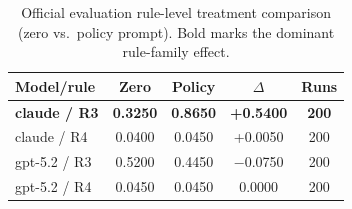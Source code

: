 \begin{table}[t]
\caption{Official evaluation rule-level treatment comparison (zero vs.\ policy prompt). Bold marks the dominant rule-family effect.}
\label{tab:evaluation_rule_treatment}
\centering
\small
\setlength{\tabcolsep}{2pt}
\begin{tabularx}{\columnwidth}{@{}LCCCC@{}}
\toprule
Model/rule & Zero & Policy & $\Delta$ & Runs \\
\midrule
\textbf{claude / R3} & \textbf{0.3250} & \textbf{0.8650} & \textbf{+0.5400} & \textbf{200} \\
claude / R4 & 0.0400 & 0.0450 & +0.0050 & 200 \\
gpt-5.2 / R3 & 0.5200 & 0.4450 & $-$0.0750 & 200 \\
gpt-5.2 / R4 & 0.0450 & 0.0450 & 0.0000 & 200 \\
\bottomrule
\end{tabularx}
\end{table}
